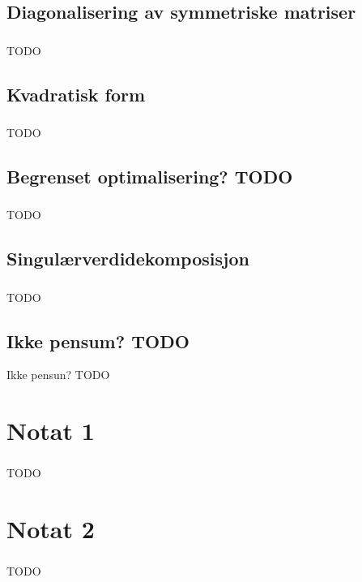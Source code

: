 \documentclass{article}
\begin{document}
    \subsection{Diagonalisering av symmetriske matriser}
      \subsubsection{}
        TODO
    \subsection{Kvadratisk form}
      \subsubsection{}
        TODO
    \subsection{Begrenset optimalisering? TODO}
      \subsubsection{}
        TODO
    \subsection{Singulærverdidekomposisjon}
      \subsubsection{}
        TODO
    \subsection{Ikke pensum? TODO}
      Ikke pensun? TODO
  \section{Notat 1}
    \subsubsection{}
      TODO
  \section{Notat 2}
    \subsubsection{}
      TODO
\end{document}

